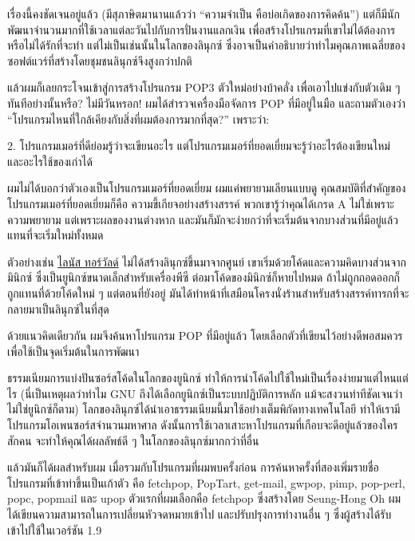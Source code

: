 เรื่องนี้คงชัดเจนอยู่แล้ว (มีสุภาษิตมานานแล้วว่า ``ความจำเป็น
คือบ่อเกิดของการคิดค้น'')
แต่ก็มีนักพัฒนาจำนวนมากที่ใช้เวลาแต่ละวันไปกับการปั่นงานแลกเงิน
เพื่อสร้างโปรแกรมที่เขาไม่ได้ต้องการ หรือไม่ได้รักที่จะทำ
แต่ไม่เป็นเช่นนั้นในโลกของลินุกซ์
ซึ่งอาจเป็นคำอธิบายว่าทำไมคุณภาพเฉลี่ยของซอฟต์แวร์ที่สร้างโดยชุมชนลินุกซ์จึงสูงกว่าปกติ

แล้วผมก็เลยกระโจนเข้าสู่การสร้างโปรแกรม POP3 ตัวใหม่อย่างบ้าคลั่ง
เพื่อเอาไปแข่งกับตัวเดิม ๆ  ทันทีอย่างนั้นหรือ? ไม่มีวันหรอก!
ผมได้สำรวจเครื่องมือจัดการ POP ที่มีอยู่ในมือ และถามตัวเองว่า
``โปรแกรมไหนที่ใกล้เคียงกับสิ่งที่ผมต้องการมากที่สุด?'' เพราะว่า:

\begin{fancyquotes}
  2. โปรแกรมเมอร์ที่ดีย่อมรู้ว่าจะเขียนอะไร
  แต่โปรแกรมเมอร์ที่ยอดเยี่ยมจะรู้ว่าอะไรต้องเขียนใหม่
  และอะไรใช้ของเก่าได้
\end{fancyquotes}

ผมไม่ได้บอกว่าตัวเองเป็นโปรแกรมเมอร์ที่ยอดเยี่ยม ผมแค่พยายามเลียนแบบดู
คุณสมบัติที่สำคัญของโปรแกรมเมอร์ที่ยอดเยี่ยมก็คือ
ความขี้เกียจอย่างสร้างสรรค์ พวกเขารู้ว่าคุณได้เกรด A
ไม่ใช่เพราะความพยายาม แต่เพราะผลของงานต่างหาก
และมันก็มักจะง่ายกว่าที่จะเริ่มต้นจากบางส่วนที่มีอยู่แล้ว
แทนที่จะเริ่มใหม่ทั้งหมด

ตัวอย่างเช่น \href{http://catb.org/~esr/faqs/linus}{ไลนัส ทอร์วัลด์}
ไม่ได้สร้างลินุกซ์ขึ้นมาจากศูนย์
เขาเริ่มด้วยโค้ดและความคิดบางส่วนจากมินิกซ์
ซึ่งเป็นยูนิกซ์ขนาดเล็กสำหรับเครื่องพีซี ต่อมาโค้ดของมินิกซ์ก็หายไปหมด
ถ้าไม่ถูกถอดออกก็ถูกแทนที่ด้วยโค้ดใหม่ ๆ  แต่ตอนที่ยังอยู่
มันได้ทำหน้าที่เสมือนโครงนั่งร้านสำหรับสร้างสรรค์ทารกที่จะกลายมาเป็นลินุกซ์ในที่สุด

ด้วยแนวคิดเดียวกัน ผมจึงค้นหาโปรแกรม POP ที่มีอยู่แล้ว
โดยเลือกตัวที่เขียนไว้อย่างดีพอสมควร เพื่อใช้เป็นจุดเริ่มต้นในการพัฒนา

ธรรมเนียมการแบ่งปันซอร์สโค้ดในโลกของยูนิกซ์
ทำให้การนำโค้ดไปใช้ใหม่เป็นเรื่องง่ายมาแต่ไหนแต่ไร (นี่เป็นเหตุผลว่าทำไม
GNU ถึงได้เลือกยูนิกซ์เป็นระบบปฏิบัติการหลัก
แม้จะสงวนท่าทีชัดเจนว่าไม่ใช่ยูนิกซ์ก็ตาม)
โลกของลินุกซ์ได้นำเอาธรรมเนียมนี้มาใช้อย่างเต็มพิกัดทางเทคโนโลยี
ทำให้เรามีโปรแกรมโอเพนซอร์สจำนวนมหาศาล
ดังนั้นการใช้เวลาเสาะหาโปรแกรมที่เกือบจะดีอยู่แล้วของใครสักคน
จะทำให้คุณได้ผลลัพธ์ดี ๆ  ในโลกของลินุกซ์มากกว่าที่อื่น

แล้วมันก็ได้ผลสำหรับผม เมื่อรวมกับโปรแกรมที่ผมพบครั้งก่อน
การค้นหาครั้งที่สองเพิ่มรายชื่อโปรแกรมที่เข้าท่าขึ้นเป็นเก้าตัว คือ
fetchpop, PopTart, get-mail, gwpop, pimp, pop-perl, popc, popmail และ
upop ตัวแรกที่ผมเลือกคือ fetchpop ซึ่งสร้างโดย Seung-Hong Oh
ผมได้เขียนความสามารถในการเปลี่ยนหัวจดหมายเข้าไป และปรับปรุงการทำงานอื่น ๆ
ซึ่งผู้สร้างได้รับเข้าไปใช้ในเวอร์ชัน 1.9

